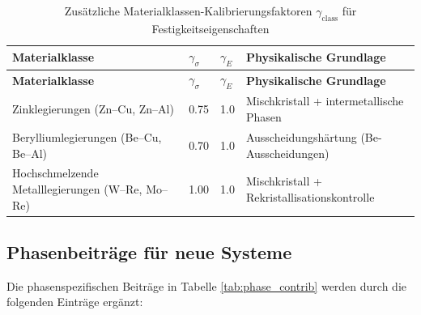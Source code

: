 \documentclass[12pt,a4paper]{article}
\begin{document}
	\begin{longtable}{p{3.5cm} p{2.5cm} p{2.5cm} p{5cm}}
		\caption{Zusätzliche Materialklassen-Kalibrierungsfaktoren $\gamma_{\text{class}}$ für Festigkeitseigenschaften}\label{tab:gamma_class_extended}\\
		\toprule
		\textbf{Materialklasse} & $\gamma_{\sigma}$ & $\gamma_{E}$ & \textbf{Physikalische Grundlage} \\
		\midrule
		\endfirsthead
		\toprule
		\textbf{Materialklasse} & $\gamma_{\sigma}$ & $\gamma_{E}$ & \textbf{Physikalische Grundlage} \\
		\midrule
		\endhead
		Zinklegierungen (Zn–Cu, Zn–Al) & 0.75 & 1.0 & Mischkristall + intermetallische Phasen \\
		Berylliumlegierungen (Be–Cu, Be–Al) & 0.70 & 1.0 & Ausscheidungshärtung (Be-Ausscheidungen) \\
		Hochschmelzende Metalllegierungen (W–Re, Mo–Re) & 1.00 & 1.0 & Mischkristall + Rekristallisationskontrolle \\
		\bottomrule
	\end{longtable}
	
	\subsection*{Phasenbeiträge für neue Systeme}
	Die phasenspezifischen Beiträge in Tabelle \ref{tab:phase_contrib} werden durch die folgenden Einträge ergänzt:
	
\end{document}
